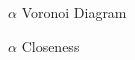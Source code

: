 \begin{frame}{$\alpha$ Voronoi Diagram}
    \begin{block}{$\alpha$ Closeness}

    \end{block} 
\end{frame}